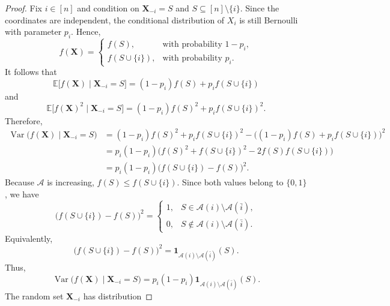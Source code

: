 \documentclass[11pt]{article}
\numberwithin{equation}{section}
\theoremstyle{definition}
\theoremstyle{remark}
\begin{document}
\begin{proof}
Fix
$i\in[n]$ and condition on
$
 \mathbf X_{-i}=S
$ 
and
$
 S\subseteq[n]\setminus\{i\}.
$
Since the coordinates are independent, the conditional distribution of
$X_i$ is still Bernoulli with parameter $p_i$. Hence,
\begin{equation*}
 f(\mathbf X)
 =
 \begin{cases}
  f(S),&\text{with probability }1-p_i,\\
  f(S\cup\{i\}),&\text{with probability }p_i.
 \end{cases}
\end{equation*}
It follows that
\begin{equation*}
 \mathbb E\bigl[
 f(\mathbf X)\mid\mathbf X_{-i}=S
 \bigr]
 =
 (1-p_i)f(S)+p_i f(S\cup\{i\})
\end{equation*}
and
\begin{equation*}
 \mathbb E\bigl[
 f(\mathbf X)^2\mid\mathbf X_{-i}=S
 \bigr]
 =
 (1-p_i)f(S)^2+p_i f(S\cup\{i\})^2.
\end{equation*}
Therefore,
\begin{align*}
 \operatorname{Var}
 \bigl(f(\mathbf X)\mid\mathbf X_{-i}=S\bigr)&=
 (1-p_i)f(S)^2+p_i f(S\cup\{i\})^2-
 \bigl((1-p_i)f(S)+p_i f(S\cup\{i\})\bigr)^2\\
 &=
 p_i(1-p_i)
 \bigl(
 f(S)^2+f(S\cup\{i\})^2
 -2f(S)f(S\cup\{i\})
 \bigr)\\
 &=
 p_i(1-p_i)
 \bigl(f(S\cup\{i\})-f(S)\bigr)^2.
 \label{eq:conditional-variance-calculation}
\end{align*}
Because $\mathcal{A}$ is increasing, 
$
 f(S)\leq f(S\cup\{i\}).
$
Since both values belong to $\{0,1\}$, we have
\begin{equation*}
 \bigl(f(S\cup\{i\})-f(S)\bigr)^2
 =
 \begin{cases}
  1,
  &S\in\mathcal{A}(i)\setminus\mathcal{A}(\bar{i}),\\
  0,
  &S\notin\mathcal{A}(i)\setminus\mathcal{A}(\bar{i}).
 \end{cases}
\end{equation*}
Equivalently,
\begin{equation*}
 \bigl(f(S\cup\{i\})-f(S)\bigr)^2
 =
 \mathbf 1_{\mathcal{A}(i)\setminus
 \mathcal{A}(\bar{i})}(S).
\end{equation*}
Thus,
\begin{equation*}
 \operatorname{Var}
 \bigl(f(\mathbf X)\mid\mathbf X_{-i}=S\bigr)
 =
 p_i(1-p_i)
 \mathbf 1_{\mathcal{A}(i)\setminus
 \mathcal{A}(\bar{i})}(S).
\end{equation*}
The random set $\mathbf X_{-i}$ has distribution

\end{proof}
\end{document}

